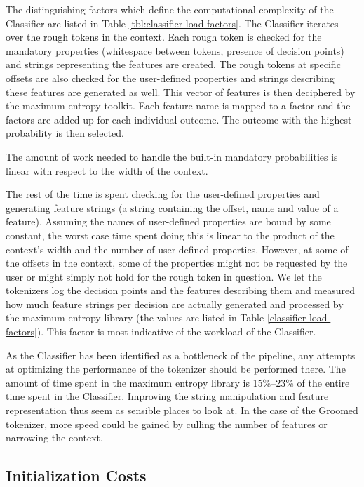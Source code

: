 The distinguishing factors which define the computational complexity of the
Classifier are listed in Table \ref{tbl:classifier-load-factors}. The
Classifier iterates over the rough tokens in the context. Each rough token is
checked for the mandatory properties (whitespace between tokens, presence of
decision points) and strings representing the features are created. The rough
tokens at specific offsets are also checked for the user-defined properties and
strings describing these features are generated as well. This vector of
features is then deciphered by the maximum entropy toolkit. Each feature name
is mapped to a factor and the factors are added up for each individual outcome.
The outcome with the highest probability is then selected.

The amount of work needed to handle the built-in mandatory probabilities is
linear with respect to the width of the context.

The rest of the time is spent checking for the user-defined properties and
generating feature strings (a string containing the offset, name and value of a
feature). Assuming the names of user-defined properties are bound by some
constant, the worst case time spent doing this is linear to the product of the
context's width and the number of user-defined properties. However, at some of
the offsets in the context, some of the properties might not be requested by
the user or might simply not hold for the rough token in question. We let the
tokenizers log the decision points and the features describing them and
measured how much feature strings per decision are actually generated and
processed by the maximum entropy library (the values are listed in Table
\ref{classifier-load-factors}). This factor is most indicative of the
workload of the Classifier.

As the Classifier has been identified as a bottleneck of the pipeline, any
attempts at optimizing the performance of the tokenizer should be performed
there. The amount of time spent in the maximum entropy library is 15\%--23\% of
the entire time spent in the Classifier. Improving the string manipulation and
feature representation thus seem as sensible places to look at. In the case of
the Groomed tokenizer, more speed could be gained by culling the number of
features or narrowing the context.

\subsection{Initialization Costs}
\label{ssec:eval-spd-init}

